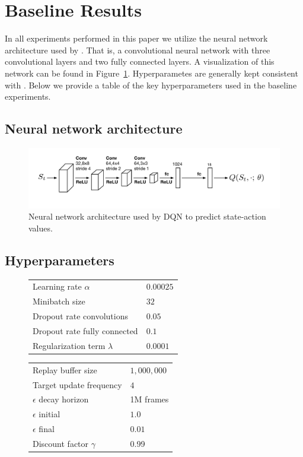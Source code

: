 \documentclass{article}
\begin{document}
\section{Baseline Results}
\label{appendix:baselines}

In all experiments performed in this paper we utilize the neural network architecture used by \cite{Mnih15}. That is, a convolutional neural network with three convolutional layers and two fully connected layers. A visualization of this network can be found in Figure~\ref{fig:architechture}. Hyperparametes are generally kept consistent with \cite{Machado18}. Below we provide a table of the key hyperparameters used in the baseline experiments.

\subsection*{Neural network architecture}
\begin{figure}[h]
    \centering
    \includegraphics[scale=0.3]{figures/architecture.pdf}
    \caption{Neural network architecture used by DQN to predict state-action values.}
    \label{fig:architechture}
\end{figure}

\subsection*{Hyperparameters}
\begin{figure}[h]
\begin{minipage}{0.5\linewidth}
    \begin{tabular}{l l}
        Learning rate $\alpha$ & $0.00025$ \\
        Minibatch size & $32$ \\
        Dropout rate convolutions & $0.05$ \\
        Dropout rate fully connected & $0.1$ \\
        Regularization term $\lambda$ & $0.0001$
    \end{tabular}
\end{minipage}
\begin{minipage}{0.5\linewidth}
    \begin{tabular}{l l}
        Replay buffer size & $1,000,000$ \\
        Target update frequency & $4$ \\
        $\epsilon$ decay horizon & 1M frames \\
        $\epsilon$ initial & $1.0$ \\
        $\epsilon$ final & $0.01$ \\
        Discount factor $\gamma$ & 0.99 \\
    \end{tabular}
\end{minipage}
\end{figure}
\end{document}
